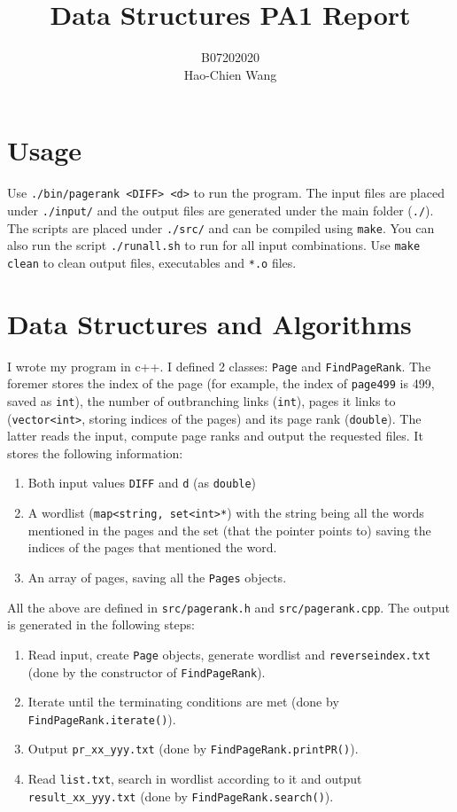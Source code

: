 \documentclass[12pt]{article}
\title{Data Structures PA1 Report}
\author{{\scriptsize B07202020}\\Hao-Chien Wang}
\begin{document}
\maketitle

\section{Usage}%
Use \texttt{./bin/pagerank <DIFF> <d>} to run the program. The input files are
placed under \texttt{./input/} and the output files are generated under the main
folder (\texttt{./}). The scripts are placed under \texttt{./src/} and can be 
compiled using \texttt{make}. You can also run the script \texttt{./runall.sh}
to run for all input combinations. Use \texttt{make clean} to clean output files,
executables and \texttt{*.o} files.

\section{Data Structures and Algorithms}%

I wrote my program in c++. I defined 2 classes: \texttt{Page} and 
\texttt{FindPageRank}. The foremer stores the index of the page (for example,
the index of \texttt{page499} is 499, saved as \texttt{int}), the number of 
outbranching links (\texttt{int}), pages it links to (\texttt{vector<int>}, storing
indices of the pages) and its page rank (\texttt{double}). The latter reads
the input, compute page ranks and output the requested files. It stores the following
information:
\begin{enumerate}
	\item Both input values \texttt{DIFF} and \texttt{d} (as \texttt{double})
	\item A wordlist (\texttt{map<string, set<int>*}) with the string being all
		the words mentioned in the pages and the set (that the pointer points 
		to) saving the indices of the pages that mentioned the word. 
	\item An array of pages, saving all the \texttt{Pages} objects.
\end{enumerate}
All the above are defined in \texttt{src/pagerank.h} and \texttt{src/pagerank.cpp}. 
The output is generated in the following steps:

\begin{enumerate}
	\item Read input, create \texttt{Page} objects, generate wordlist and
		\texttt{reverseindex.txt} (done by the constructor of \texttt{FindPageRank}).
	\item Iterate until the terminating conditions are met (done by 
		\texttt{FindPageRank.iterate()}).
	\item Output \texttt{pr\_xx\_yyy.txt} (done by \texttt{FindPageRank.printPR()}).
	\item Read \texttt{list.txt}, search in wordlist according to it and output 
		\texttt{result\_xx\_yyy.txt} (done by \texttt{FindPageRank.search()}).
\end{enumerate}
\end{document}

